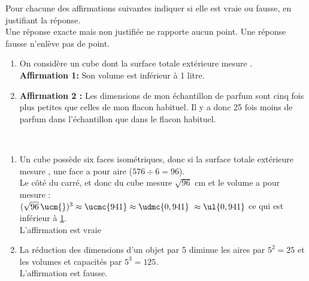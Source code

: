 \begin{exercice}[CRPE 2018 G1-G3] %
   Pour chacune des affirmations suivantes indiquer si elle est vraie ou fausse, en justifiant la réponse. \\
   Une réponse exacte mais non justifiée ne rapporte aucun point. Une réponse fausse n'enlève pas de point.
   \begin{enumerate}
      \item On considère un cube dont la surface totale extérieure mesure . \\
         {\bf Affirmation 1:} Son volume est inférieur à 1 litre.
      \item {\bf Affirmation 2 :} Les dimensions de mon échantillon de parfum sont cinq fois plus petites que celles de mon flacon habituel. Il y a donc 25 fois moins de parfum dans l’échantillon que dans le flacon habituel.
   \end{enumerate}
\end{exercice}

\begin{corrige}
\ \\ [-5mm]
   \begin{enumerate}
      \item Un cube possède six faces isométriques, donc si la surface totale extérieure mesure , une face a pour aire  ($576\div6 =96$). \\
         Le côté du carré, et donc du cube mesure $\sqrt{96}$ cm et le volume a pour mesure : \\
         $(\sqrt{96}\,\ucm{})^3 \approx \ucmc{941} \approx \udmc{0,941} \	\approx \ul{0,941}$ ce qui est inférieur à \ul{1}. \\
         {\blue L'affirmation est vraie} \\
      \item La réduction des dimensions d'un objet par 5 diminue les aires par $5^2 =25$ et les volumes et capacités par $5^3 =125$. \\
         {\blue L'affirmation est fausse.}
   \end{enumerate}
\end{corrige}

\bigskip



